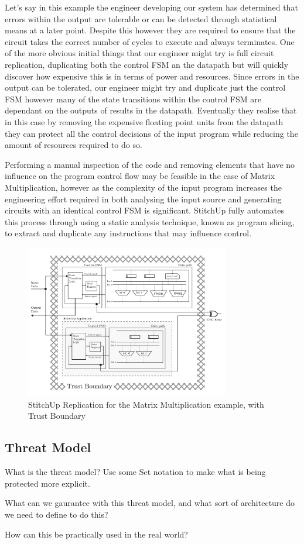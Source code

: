 Let's say in this example the engineer developing our system has determined that errors within
the output are tolerable or can be detected through statistical means at a later point.
Despite this however they are required to ensure that the circuit takes the correct number of cycles to
execute and always terminates.
One of the more obvious initial things that our engineer might try is full circuit replication, duplicating both the
control FSM an the datapath but will quickly discover how expensive this is in terms of power and resources.
Since errors in the output can be tolerated, our engineer might try and duplicate just the control FSM however
many of the state transitions within the control FSM are dependant on the outputs of results in the datapath.
Eventually  they realise that in this case by removing the expensive floating point units from the datapath
they can protect all the control decisions of the input program while reducing the amount of resources required
to do so.

Performing a manual inspection of the code and removing elements that have no influence on the program control flow
may be feasible in the case of Matrix Multiplication, however as the complexity of the input program increases
the engineering effort required in both analysing the input source and generating circuits with an identical control FSM is
significant.
StitchUp fully automates this process through using a static analysis technique, known as program slicing, to extract
and duplicate any instructions that may influence control.


\begin{figure}[!t]
\centering
\includegraphics[width=3.5in]{./imgs/HLSArch.pdf}
\caption{StitchUp Replication for the Matrix Multiplication example, with Trust Boundary}
\label{fig:HLSArch}
\end{figure}

\subsection{Threat Model}
What is the threat model?
Use some Set notation to make what is being protected more explicit.

What can we gaurantee with this threat model, and what sort of architecture
do we need to define to do this?

How can this be practically used in the real world?

